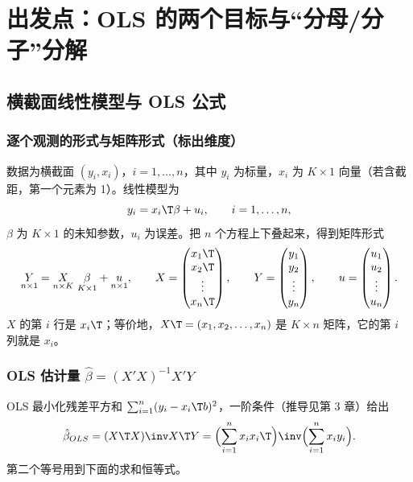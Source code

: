\section{出发点：OLS 的两个目标与“分母/分子”分解}\label{sec:U05a-start}

\subsection{横截面线性模型与 OLS 公式}

\subsubsection{逐个观测的形式与矩阵形式（标出维度）}

数据为横截面 $(y_i,x_i)$，$i=1,\dots,n$，其中 $y_i$ 为标量，$x_i$ 为 $K\times1$ 向量（若含截距，第一个元素为 1）。线性模型为
\begin{equation}\label{eq:U05a-model}
y_i=x_i\T\beta+u_i,\qquad i=1,\dots,n,
\end{equation}
$\beta$ 为 $K\times1$ 的未知参数，$u_i$ 为误差。把 $n$ 个方程上下叠起来，得到矩阵形式
\[
\underset{n\times1}{Y}=\underset{n\times K}{X}\ \underset{K\times1}{\beta}+\underset{n\times1}{u},\qquad
X=\begin{pmatrix}x_1\T\\ x_2\T\\ \vdots\\ x_n\T\end{pmatrix},\qquad
Y=\begin{pmatrix}y_1\\ y_2\\ \vdots\\ y_n\end{pmatrix},\qquad
u=\begin{pmatrix}u_1\\ u_2\\ \vdots\\ u_n\end{pmatrix}.
\]
$X$ 的第 $i$ 行是 $x_i\T$；等价地，$X\T=(x_1,x_2,\dots,x_n)$ 是 $K\times n$ 矩阵，它的第 $i$ 列就是 $x_i$。

\subsubsection{OLS 估计量 \texorpdfstring{$\hat\beta=(X'X)^{-1}X'Y$}{beta-hat = (X'X)inv X'Y}}

OLS 最小化残差平方和 $\sum_{i=1}^n(y_i-x_i\T b)^2$，一阶条件（推导见第 3 章）给出
\begin{equation}\label{eq:U05a-ols}
\hat\beta_{OLS}=(X\T X)\inv X\T Y=\Bigl(\sum_{i=1}^n x_ix_i\T\Bigr)\inv\Bigl(\sum_{i=1}^n x_iy_i\Bigr).
\end{equation}
第二个等号用到下面的求和恒等式。

